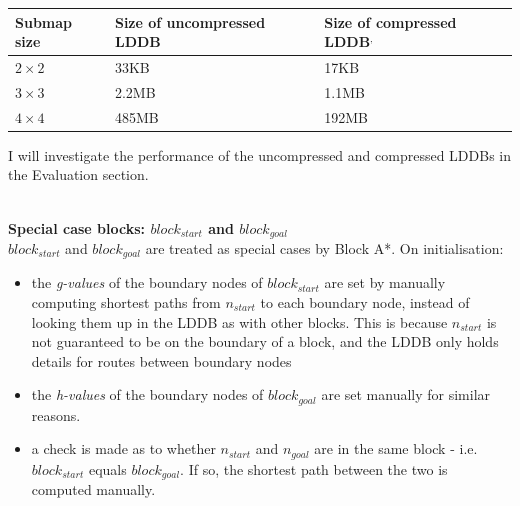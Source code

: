 \documentclass[12pt,twoside,notitlepage]{report}
\begin{document}
\begin{center}
    \begin{tabular}{| l | l | l |}
    \hline
    Submap size & Size of uncompressed LDDB & Size of compressed LDDB\footnotemark[3]$^{,}$\footnotemark[4]  \\ \hline
    {$2 \times 2$}  & 33KB  & 17KB \\ \hline
    {$3 \times 3$}  & 2.2MB & 1.1MB \\ \hline
    {$4 \times 4$}  & 485MB & 192MB \\ \hline
  \end{tabular}
\end{center}

\noindent
I will investigate the performance of the uncompressed and compressed LDDBs in the Evaluation section.\\
\\


\noindent
{\bf Special case blocks: $block_{start}$ and $block_{goal}$} \\

\noindent
$block_{start}$ and $block_{goal}$ are treated as special cases by Block A*. On initialisation:
\begin{itemize}
\item the {\em g-values} of the boundary nodes of $block_{start}$ are set by manually computing shortest paths from $n_{start}$ to each boundary node, instead of looking them up in the LDDB as with other blocks. This is because $n_{start}$ is not guaranteed to be on the boundary of a block, and the LDDB only holds details for routes between boundary nodes
\item the {\em h-values} of the boundary nodes of $block_{goal}$ are set manually for similar reasons.
\item a check is made as to whether $n_{start}$ and $n_{goal}$ are in the same block - i.e. $block_{start}$ equals $block_{goal}$. If so, the shortest path between the two is computed  manually.
\end{itemize}
\end{document}
